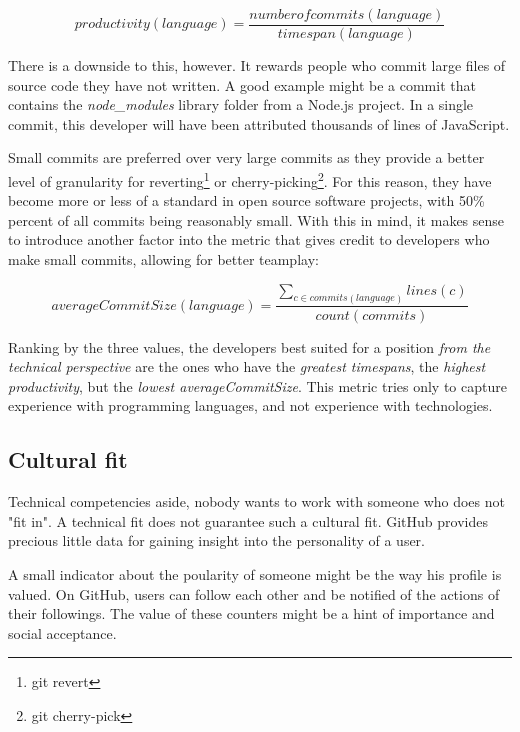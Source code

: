 \begin{equation}
productivity(language) = \frac{numberofcommits(language)}{timespan(language)}
\label{eq:productivity}
\end{equation}

There is a downside to this, however. It rewards people who commit large files of source code they have not written. A good example might be a commit that contains the \textit{node\_modules} library folder from a Node.js project. In a single commit, this developer will have been attributed thousands of lines of JavaScript.

Small commits are preferred \cite{so:commitsize} over very large commits as they provide a better level of granularity for reverting\footnote{git revert} or cherry-picking\footnote{git cherry-pick}. For this reason, they have become more or less of a standard in open source software projects, with 50\% percent of all commits being reasonably small\cite{rsk:2014}. With this in mind, it makes sense to introduce another factor into the metric that gives credit to developers who make small commits, allowing for better teamplay:

\begin{equation}
averageCommitSize(language) = \frac{\sum_{c \in commits(language)} lines(c)}{count(commits)}
\label {eq:avgcommitsize}
\end{equation}

Ranking by the three values, the developers best suited for a position \textit{from the technical perspective} are the ones who have the \textit{greatest timespans}, the \textit{highest productivity}, but the \textit{lowest averageCommitSize}. This metric tries only to capture experience with programming languages, and not experience with technologies.

\subsection{Cultural fit}
Technical competencies aside, nobody wants to work with someone who does not "fit in".
A technical fit does not guarantee such a cultural fit. GitHub provides precious little data for gaining insight into the personality of a user.
\newline

A small indicator about the poularity of someone might be the way his profile is valued. On GitHub, users can follow each other and be notified of the actions of their followings. The value of these counters might be a hint of importance and social acceptance.
\newline

